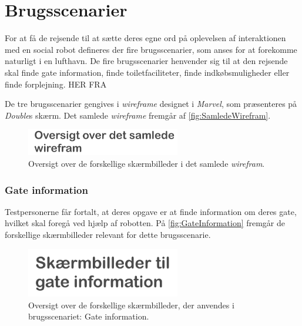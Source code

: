 \section{Brugsscenarier}
\label{ParametreBrugsscenarier}
%
For at få de rejsende til at sætte deres egne ord på oplevelsen af interaktionen med en social robot defineres der fire brugsscenarier, som anses for at forekomme naturligt i en lufthavn. De fire brugsscenarier henvender sig til at den rejsende skal finde gate information, finde toiletfaciliteter, finde indkøbsmuligheder eller finde forplejning. 
HER FRA

De tre brugsscenarier gengives i \textit{wireframe} designet i \textit{Marvel}, som præsenteres på \textit{Double}s skærm. Det samlede \textit{wireframe} fremgår af \autoref{fig:SamledeWirefram}.
%
\begin{figure}[H]
\centering
\includegraphics[width = 0.6\textwidth]{Figure/SamledeWirefram} 
\caption{Oversigt over de forskellige skærmbilleder i det samlede \textit{wirefram}.}
\label{fig:SamledeWirefram}
\end{figure}
\noindent
%  

\subsubsection*{Gate information}
%
Testpersonerne får fortalt, at deres opgave er at finde information om deres gate, hvilket skal foregå ved hjælp af robotten. På \autoref{fig:GateInformation} fremgår de forskellige skærmbilleder relevant for dette brugsscenarie. 
%
\begin{figure}[H]
\centering
\includegraphics[width = 0.6\textwidth]{Figure/GateInformation} 
\caption{Oversigt over de forskellige skærmbilleder, der anvendes i brugsscenariet: Gate information.}
\label{fig:GateInformation}
\end{figure}
\noindent
%  


